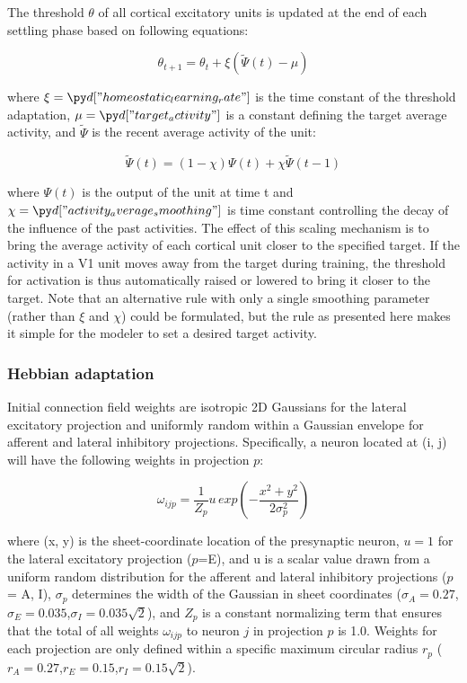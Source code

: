 \documentclass[utf8]{frontiersSCNS}
\begin{document}
The threshold $\theta$ of all cortical excitatory units is updated at the end of each settling phase based on following 
equations:

\begin{equation}
	\theta_{t+1} = \theta_{t} + \xi (\tilde{\Psi}(t) - \mu) 
\end{equation}

\noindent where $\xi=\insval{homeostatic_learning_rate}$ is the time constant of the threshold adaptation,
$\mu=\insval{target_activity}$ is a constant defining the target average activity, and $\tilde{\Psi}$ is 
the recent average activity of the unit:

\begin{equation}
  \tilde{\Psi}(t) = (1 - \chi)\Psi(t) + \chi\tilde{\Psi}(t-1)  
\end{equation}

\noindent where $\Psi(t)$ is the output of the unit at time t and $\chi=\insval{activity_average_smoothing}$ is time constant 
controlling the decay of the influence of the past activities. The effect of this scaling mechanism is to bring the average activity of each 
cortical unit closer to the specified target. If the activity in a V1 unit moves away from the target during training, the threshold for activation is thus automatically raised or lowered to bring it closer to the target. Note that an alternative rule with only a single smoothing parameter (rather than
$\xi$ and  $\chi$) could be formulated, but the rule as presented here makes it simple for the modeler to set a desired target activity.

\subsubsection{Hebbian adaptation}

Initial connection field weights are isotropic 2D Gaussians for the lateral excitatory projection and uniformly random within a Gaussian envelope for afferent and lateral inhibitory projections. Specifically, a neuron located at (i, j) will have the following weights in projection $p$:

\begin{equation}
\omega_{ijp} = \frac{1}{Z_{p}} u\, exp(- \frac{x^2+y^2}{2\sigma^2_p} )
\end{equation}

\noindent where (x, y) is the sheet-coordinate location of the presynaptic neuron, $u=1$ for the lateral excitatory projection ($p$=E), and u is a scalar value drawn from a uniform random distribution for the afferent and lateral inhibitory projections ($p$ = A, I),
$\sigma_{p}$ determines the width of the Gaussian in sheet coordinates ($\sigma_{A}=0.27$,$\sigma_{E}=0.035$,$\sigma_{I}=0.035 \sqrt{2}$), 
and $Z_{p}$ is a constant normalizing term that ensures that the total of all weights $\omega_{ijp}$ to neuron $j$ in projection $p$ is 1.0. Weights for each projection are only defined within a specific maximum circular radius $r_p$ ($r_{A}=0.27$,$r_{E}=0.15$,$r_{I}=0.15 \sqrt{2}$).
\end{document}
